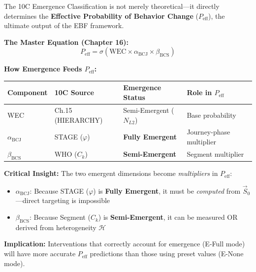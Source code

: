 \begin{tcolorbox}[colback=purple!5!white, colframe=purple!75!black,
    title=\textbf{Connection to $P_{\text{eff}}$: How Emergence Feeds the Final Output (Ch.16)}]

The 10C Emergence Classification is not merely theoretical---it directly determines the \textbf{Effective Probability of Behavior Change} ($P_{\text{eff}}$), the ultimate output of the EBF framework.

\textbf{The Master Equation (Chapter 16):}
\begin{equation}
\boxed{P_{\text{eff}} = \sigma(\text{WEC} \times \alpha_{\text{BCJ}} \times \beta_{\text{BCS}})}
\end{equation}

\textbf{How Emergence Feeds $P_{\text{eff}}$:}
\begin{center}
\renewcommand{\arraystretch}{1.3}
\begin{tabular}{@{}llll@{}}
\toprule
\textbf{Component} & \textbf{10C Source} & \textbf{Emergence Status} & \textbf{Role in $P_{\text{eff}}$} \\
\midrule
WEC & Ch.15 (HIERARCHY) & Semi-Emergent ($N_{L2}$) & Base probability \\
$\alpha_{\text{BCJ}}$ & STAGE ($\varphi$) & \textbf{Fully Emergent} & Journey-phase multiplier \\
$\beta_{\text{BCS}}$ & WHO ($C_k$) & \textbf{Semi-Emergent} & Segment multiplier \\
\bottomrule
\end{tabular}
\end{center}

\textbf{Critical Insight:} The two emergent dimensions become \textit{multipliers} in $P_{\text{eff}}$:
\begin{itemize}[nosep]
    \item $\alpha_{\text{BCJ}}$: Because STAGE ($\varphi$) is \textbf{Fully Emergent}, it must be \textit{computed} from $\vec{S}_0$---direct targeting is impossible
    \item $\beta_{\text{BCS}}$: Because Segment ($C_k$) is \textbf{Semi-Emergent}, it can be measured OR derived from heterogeneity $\mathcal{H}$
\end{itemize}

\textbf{Implication:} Interventions that correctly account for emergence (E-Full mode) will have more accurate $P_{\text{eff}}$ predictions than those using preset values (E-None mode).

\end{tcolorbox}


